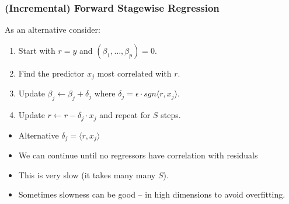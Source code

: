 \begin{frame}
\frametitle{(Incremental) Forward Stagewise Regression}
As an alternative consider:
\begin{enumerate}
\item Start with $r= y$ and $(\beta_1, \ldots, \beta_p) = 0$.
\item Find the predictor $x_j$ most correlated with $r$.
\item Update $\beta_j \leftarrow \beta_j + \delta_j$ where $\delta_j = \epsilon \cdot sgn \langle r , x_j \rangle$.
\item Update $r \leftarrow r - \delta_j \cdot x_j$ and repeat for $S$ steps.
\end{enumerate}
\begin{itemize}
\item Alternative $\delta_j =  \langle r , x_j \rangle$
\item We can continue until no regressors have correlation with residuals 
\item This is very slow (it takes many many $S$).
\item Sometimes slowness can be good -- in high dimensions to avoid overfitting.
\end{itemize}
\end{frame}



